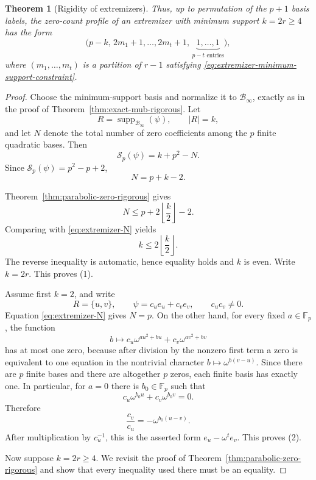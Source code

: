 \documentclass[11pt]{article}
\newtheorem{theorem}{Theorem}[section]
\newcommand{\F}{\mathbb F}
\newcommand{\supp}{\operatorname{supp}}
\begin{document}
\begin{theorem}[Rigidity of extremizers]
Thus, up to permutation of the \(p+1\) basis labels, the zero-count
profile of an extremizer with minimum support \(k=2r\ge4\) has the form
\begin{equation}
 \boxed{
 \bigl(
 p-k,\,
 2m_1+1,\ldots,2m_t+1,\,
 \underbrace{1,\ldots,1}_{p-t\text{ entries}}
 \bigr),
 }
 \label{eq:extremizer-zero-profile}
\end{equation}
where \((m_1,\ldots,m_t)\) is a partition of \(r-1\) satisfying
\eqref{eq:extremizer-minimum-support-constraint}.
\end{theorem}

\begin{proof}
Choose the minimum-support basis and normalize it to
\(\mathcal B_\infty\), exactly as in the proof of
Theorem~\ref{thm:exact-mub-rigorous}.  Let
\[
 R=\supp_{\mathcal B_\infty}(\psi),
 \qquad |R|=k,
\]
and let \(N\) denote the total number of zero coefficients among the
\(p\) finite quadratic bases.  Then
\begin{equation}
 \mathcal S_p(\psi)=k+p^2-N.
 \label{eq:extremizer-S-vs-N}
\end{equation}
Since \(\mathcal S_p(\psi)=p^2-p+2\),
\begin{equation}
 N=p+k-2.
 \label{eq:extremizer-N}
\end{equation}

Theorem~\ref{thm:parabolic-zero-rigorous} gives
\[
 N\le p+2\left\lfloor\frac{k}{2}\right\rfloor-2.
\]
Comparing with \eqref{eq:extremizer-N} yields
\[
 k\le2\left\lfloor\frac{k}{2}\right\rfloor.
\]
The reverse inequality is automatic, hence equality holds and \(k\) is
even.  Write \(k=2r\).  This proves (1).

Assume first \(k=2\), and write
\[
 R=\{u,v\},
 \qquad
 \psi=c_u e_u+c_v e_v,
 \qquad c_uc_v\ne0.
\]
Equation \eqref{eq:extremizer-N} gives \(N=p\).  On the other hand,
for every fixed \(a\in\F_p\), the function
\[
 b\longmapsto
 c_u\omega^{a u^2+bu}+c_v\omega^{a v^2+bv}
\]
has at most one zero, because after division by the nonzero first term
a zero is equivalent to one equation in the nontrivial character
\(b\mapsto\omega^{b(v-u)}\).  Since there are \(p\) finite bases and
there are altogether \(p\) zeros, each finite basis has exactly one.
In particular, for \(a=0\) there is \(b_0\in\F_p\) such that
\[
 c_u\omega^{b_0u}+c_v\omega^{b_0v}=0.
\]
Therefore
\[
 \frac{c_v}{c_u}=-\omega^{b_0(u-v)}.
\]
After multiplication by \(c_u^{-1}\), this is the asserted form
\(e_u-\omega^t e_v\).  This proves (2).

Now suppose \(k=2r\ge4\).  We revisit the proof of
Theorem~\ref{thm:parabolic-zero-rigorous} and show that every inequality
used there must be an equality.


\end{proof}
\end{document}
